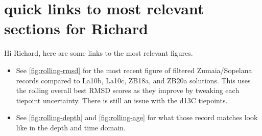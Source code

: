 \documentclass[draft]{agujournal2019}
\begin{document}
%
%
%
%





\section*{quick links to most relevant sections for Richard}
Hi Richard, here are some links to the most relevant figures.

\begin{itemize}
\item See \cref{fig:rolling-rmsd} for the most recent figure of filtered
  Zumaia/Sopelana records compared to La10b, La10c, ZB18a, and ZB20a solutions.
  This uses the rolling overall best \gls{RMSD} scores as they improve by
  tweaking each tiepoint uncertainty. There is still an issue with the
  \acrshort{d13C} tiepoints.
\item See \cref{fig:rolling-depth} and \cref{fig:rolling-age} for what those
  record matches look like in the depth and time domain.
\end{itemize}
\end{document}
